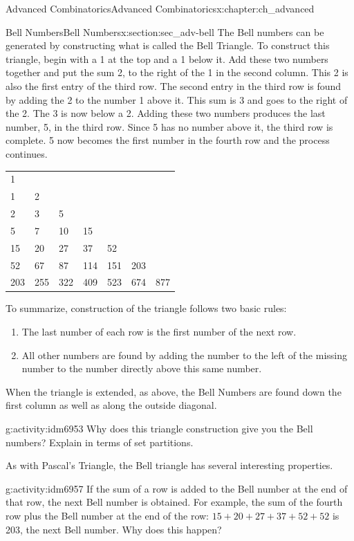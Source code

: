 \documentclass[oneside,10pt,]{book}
\numberwithin{equation}{chapter}
\begin{document}
\begin{chapterptx}{Advanced Combinatorics}{}{Advanced Combinatorics}{}{}{x:chapter:ch_advanced}
\begin{sectionptx}{Bell Numbers}{}{Bell Numbers}{}{}{x:section:sec_adv-bell}
The Bell numbers can be generated by constructing what is called the Bell Triangle. To construct this triangle, begin with a 1 at the top and a 1 below it. Add these two numbers together and put the sum 2, to the right of the 1 in the second column. This 2 is also the first entry of the third row. The second entry in the third row is found by adding the 2 to the number 1 above it. This sum is 3 and goes to the right of the 2. The 3 is now below a 2. Adding these two numbers produces the last number, 5, in the third row. Since 5 has no number above it, the third row is complete. 5 now becomes the first number in the fourth row and the process continues.%
\begin{sidebyside}{1}{0.15}{0.15}{0}%
\begin{sbspanel}{0.7}%
{\centering%
\begin{tabular}{lllllll}
1&&&&&&\tabularnewline[0pt]
1&2&&&&&\tabularnewline[0pt]
2&3&5&&&&\tabularnewline[0pt]
5&7&10&15&&&\tabularnewline[0pt]
15&20&27&37&52&&\tabularnewline[0pt]
52&67&87&114&151&203&\tabularnewline[0pt]
203&255&322&409&523&674&877
\end{tabular}
\par}
\end{sbspanel}%
\end{sidebyside}%
\par
To summarize, construction of the triangle follows two basic rules:%
\begin{enumerate}
\item{}The last number of each row is the first number of the next row.%
\item{}All other numbers are found by adding the number to the left of the missing number to the number directly above this same number.%
\end{enumerate}
When the triangle is extended, as above, the Bell Numbers are found down the first column as well as along the outside diagonal.%
\begin{activity}{}{g:activity:idm6953}%
Why does this triangle construction give you the Bell numbers?  Explain in terms of set partitions.%
\end{activity}
As with Pascal's Triangle, the Bell triangle has several interesting properties.%
\begin{activity}{}{g:activity:idm6957}%
If the sum of a row is added to the Bell number at the end of that row, the next Bell number is obtained. For example, the sum of the fourth row plus the Bell number at the end of the row: \(15 + 20 + 27 + 37 + 52 + 52\) is 203, the next Bell number.  Why does this happen?%

\end{activity}
\end{sectionptx}
\end{chapterptx}
\end{document}
